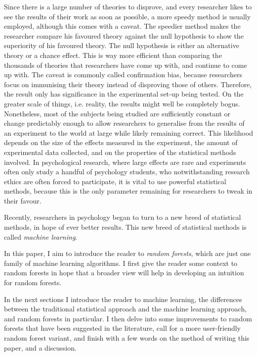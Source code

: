 \documentclass[a4paper,man,12pt,apacite,floatsintext,draftfirst]{apa6} %
\begin{document}
Since there is a large number of theories to disprove, and every
researcher likes to see the results of their work as soon as possible, a
more speedy method is usually employed, although this comes with a caveat.
The speedier method makes the researcher compare his favoured theory against
the null hypothesis to show the superiority of his favoured theory.
The null hypothesis is either an alternative theory or a chance effect.
This is way more efficient than comparing the thousands of
theories that researchers have come up with, and continue to come up with.
The caveat is commonly called confirmation bias, because researchers focus
on immunising their theory instead of disproving those of others.
Therefore, the result only has significance in the experimental set-up
being tested.
On the greater scale of things, i.e. reality, the results might well be
completely bogus.
Nonetheless, most of the subjects being studied are sufficiently constant
or change predictably enough to allow researchers to generalise from the
results of an experiment to the world at large while likely remaining correct.
This likelihood depends on the size of the effects measured in the
experiment, the amount of experimental data collected,
and on the properties of the statistical methods involved.
In psychological research, where large effects are rare and
experiments often only study a handful of psychology students, who
notwithstanding research ethics are often forced to participate, it is
vital to use powerful statistical methods, because this is the only parameter
remaining for researchers to tweak in their favour.

Recently, researchers in psychology began to turn to a new breed of
statistical methods, in hope of ever better results. This new breed of
statistical methods is called \emph{machine learning}.

In this paper, I aim to introduce the reader to \emph{random forests},
which are just one family of machine learning algorithms.
I first give the reader some context to random forests in hope that a
broader view will help in developing an intuition for random forests.

In the next sections I introduce the reader to machine learning,
the differences between the traditional statistical approach and the
machine learning approach, and random forests in particular.
I then delve into some improvements to random forests that have been
suggested in the literature, call for a more user-friendly random forest variant, and finish
with a few words on the method of writing this paper, and a discussion.
\end{document}
